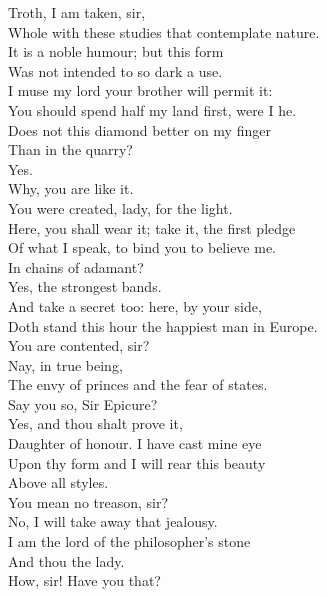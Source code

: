 \documentclass[a4paper,oneside,12pt]{memoir}
\begin{document}
\begin{drama*}
\dolspeaks {} Troth, I am taken, sir,\\
Whole with these studies that contemplate nature.\\
\mammonspeaks It is a noble humour; but this form\\
Was not intended to so dark a use.\\
I muse my lord your brother will permit it:\\
You should spend half my land first, were I he.\\
Does not this diamond better on my finger\\
Than in the quarry?\\
\dolspeaks {} Yes.\\
\mammonspeaks {} Why, you are like it.\\
You were created, lady, for the light.\\
Here, you shall wear it; take it, the first pledge\\
Of what I speak, to bind you to believe me.\\
\dolspeaks In chains of adamant?\\
\mammonspeaks {} Yes, the strongest bands.\\
And take a secret too: here, by your side,\\
Doth stand this hour the happiest man in Europe.\\
\dolspeaks You are contented, sir?\\
\mammonspeaks {} Nay, in true being,\\
The envy of princes and the fear of states.\\
\dolspeaks Say you so, Sir Epicure?\\
\mammonspeaks {} Yes, and thou shalt prove it,\\
Daughter of honour. I have cast mine eye\\
Upon thy form and I will rear this beauty\\
Above all styles.\\
\dolspeaks {} You mean no treason, sir?\\
\mammonspeaks No, I will take away that jealousy.\\
I am the lord of the philosopher's stone\\
And thou the lady.\\
\dolspeaks {} How, sir! Have you that?\\

\end{drama*}
\end{document}
